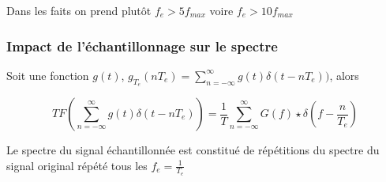 \documentclass{beamer}
\begin{document}
\begin{frame}
\begin{columns}
\end{columns}

\begin{block}{}
Dans les faits on prend plutôt $f_e > 5 f_{max}$ voire $f_e > 10 f_ {max}$
\end{block}

\end{frame}

\begin{frame}
\frametitle{Impact de l'échantillonnage sur le spectre}

Soit une fonction $g(t)$, $g_{T_e}(nT_e) = \sum_{n = -\infty}^{\infty} g(t)\delta(t-nT_e))$, alors \\

\vspace{1cm} 

\[ TF (\sum_{n = -\infty}^{\infty} g(t)\delta(t-nT_e)) = \frac{1}{T}\sum_{n = -\infty}^{\infty} G(f) \star \delta(f - \frac{n}{T_e}) \] 

\vspace{0.5cm}

\begin{block}{}
Le spectre du signal échantillonnée est constitué de répétitions du spectre du signal original répété tous les $f_e = \frac{1}{T_e}$
\end{block}


\end{frame}
\end{document}
